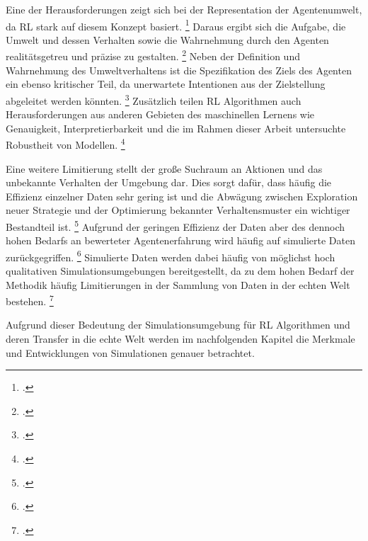 Eine der Herausforderungen zeigt sich bei der Representation der Agentenumwelt, da RL stark auf diesem Konzept basiert. \footcite[Vgl.][S. 8]{Sutton.2018}
Daraus ergibt sich die Aufgabe, die Umwelt und dessen Verhalten sowie die Wahrnehmung durch den Agenten realitätsgetreu und präzise zu gestalten. \footcite[Vgl.][S. 7]{Sutton.2018}
Neben der Definition und Wahrnehmung des Umweltverhaltens ist die Spezifikation des Ziels des Agenten ein ebenso kritischer Teil, da unerwartete Intentionen aus der Zielstellung abgeleitet werden könnten. \footcite[Vgl.][S. 7]{Li.2019}
Zusätzlich teilen RL Algorithmen auch Herausforderungen aus anderen Gebieten des maschinellen Lernens wie Genauigkeit, Interpretierbarkeit und die im Rahmen dieser Arbeit untersuchte Robustheit von Modellen. \footcite[Vgl.][S. 7]{Li.2019}

Eine weitere Limitierung stellt der große Suchraum an Aktionen und das unbekannte Verhalten der Umgebung dar.
Dies sorgt dafür, dass häufig die Effizienz einzelner Daten sehr gering ist und die Abwägung zwischen Exploration neuer Strategie und der Optimierung bekannter Verhaltensmuster ein wichtiger Bestandteil ist. \footcite[Vgl.][S. 7]{Li.2019}
Aufgrund der geringen Effizienz der Daten aber des dennoch hohen Bedarfs an bewerteter Agentenerfahrung wird häufig auf simulierte Daten zurückgegriffen. \footcite[Vgl.][S. 7]{Zhao.2020}
Simulierte Daten werden dabei häufig von möglichst hoch qualitativen Simulationsumgebungen bereitgestellt, da zu dem hohen Bedarf der Methodik häufig Limitierungen in der Sammlung von Daten in der echten Welt bestehen. \footcite[Vgl.][S. 8]{Li.2019}

Aufgrund dieser Bedeutung der Simulationsumgebung für RL Algorithmen und deren Transfer in die echte Welt werden im nachfolgenden Kapitel die Merkmale und Entwicklungen von Simulationen genauer betrachtet.